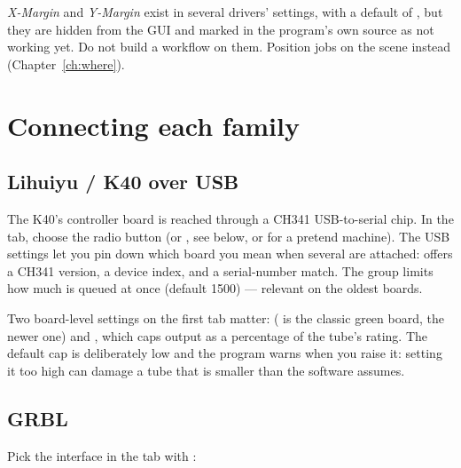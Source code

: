 \begin{notebox}
\emph{X-Margin} and \emph{Y-Margin} exist in several drivers' settings, with a
default of , but they are hidden from the GUI and marked in the program's
own source as not working yet. Do not build a workflow on them. Position jobs on
the scene instead (Chapter~\ref{ch:where}).
\end{notebox}

\section{Connecting each family}

\subsection*{Lihuiyu / K40 over USB}

The K40's controller board is reached through a CH341 USB-to-serial chip. In the
 tab, choose the radio button  (or ,
see below, or  for a pretend machine). The USB settings let you pin
down which board you mean when several are attached:  offers a CH341 version, a device index, and a serial-number match. The
 group limits how much is queued at once (default 1500) ---
relevant on the oldest boards.

Two board-level settings on the first tab matter:  ( is the
classic green board,  the newer one) and ,
which caps output as a percentage of the tube's rating. The default cap is
deliberately low and the program warns when you raise it: setting it too high can
damage a tube that is smaller than the software assumes.

\subsection*{GRBL}

Pick the interface in the  tab with :

